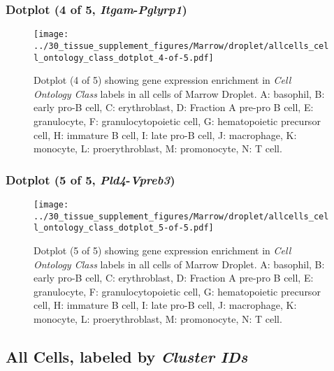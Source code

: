 \clearpage

\subsubsection{Dotplot (4 of 5, \emph{Itgam}-\emph{Pglyrp1})}
\begin{figure}[h]
\centering
\texttt{[image: ../30\_tissue\_supplement\_figures/Marrow/droplet/allcells\_cell\_ontology\_class\_dotplot\_4-of-5.pdf]}

\caption{ Dotplot (4 of 5)  showing gene expression enrichment in \emph{Cell Ontology Class} labels in all cells of Marrow Droplet. A: basophil, B: early pro-B cell, C: erythroblast, D: Fraction A pre-pro B cell, E: granulocyte, F: granulocytopoietic cell, G: hematopoietic precursor cell, H: immature B cell, I: late pro-B cell, J: macrophage, K: monocyte, L: proerythroblast, M: promonocyte, N: T cell.}
\end{figure}


\clearpage

\subsubsection{Dotplot (5 of 5, \emph{Pld4}-\emph{Vpreb3})}
\begin{figure}[h]
\centering
\texttt{[image: ../30\_tissue\_supplement\_figures/Marrow/droplet/allcells\_cell\_ontology\_class\_dotplot\_5-of-5.pdf]}

\caption{ Dotplot (5 of 5)  showing gene expression enrichment in \emph{Cell Ontology Class} labels in all cells of Marrow Droplet. A: basophil, B: early pro-B cell, C: erythroblast, D: Fraction A pre-pro B cell, E: granulocyte, F: granulocytopoietic cell, G: hematopoietic precursor cell, H: immature B cell, I: late pro-B cell, J: macrophage, K: monocyte, L: proerythroblast, M: promonocyte, N: T cell.}
\end{figure}


\clearpage

\subsection{All Cells, labeled by \emph{Cluster IDs}}
